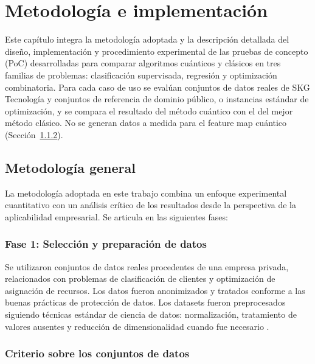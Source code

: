 \chapter{Metodología e implementación}
\label{cap:metodologia}

Este capítulo integra la metodología adoptada y la descripción detallada del diseño, implementación y procedimiento experimental de las pruebas de concepto (PoC) desarrolladas para comparar algoritmos cuánticos y clásicos en tres familias de problemas: clasificación supervisada, regresión y optimización combinatoria. Para cada caso de uso se evalúan conjuntos de datos reales de SKG Tecnología y conjuntos de referencia de dominio público, o instancias estándar de optimización, y se compara el resultado del método cuántico con el del mejor método clásico. No se generan datos a medida para el feature map cuántico (Sección~\ref{sec:sin_datos_a_medida}).

\section{Metodología general}

La metodología adoptada en este trabajo combina un enfoque experimental cuantitativo con un análisis crítico de los resultados desde la perspectiva de la aplicabilidad empresarial. Se articula en las siguientes fases:

\subsection{Fase 1: Selección y preparación de datos}

Se utilizaron conjuntos de datos reales procedentes de una empresa privada, relacionados con problemas de clasificación de clientes y optimización de asignación de recursos. Los datos fueron anonimizados y tratados conforme a las buenas prácticas de protección de datos. Los datasets fueron preprocesados siguiendo técnicas estándar de ciencia de datos: normalización, tratamiento de valores ausentes y reducción de dimensionalidad cuando fue necesario \citep{jordan2015}.

\subsection{Criterio sobre los conjuntos de datos}\label{sec:sin_datos_a_medida}

